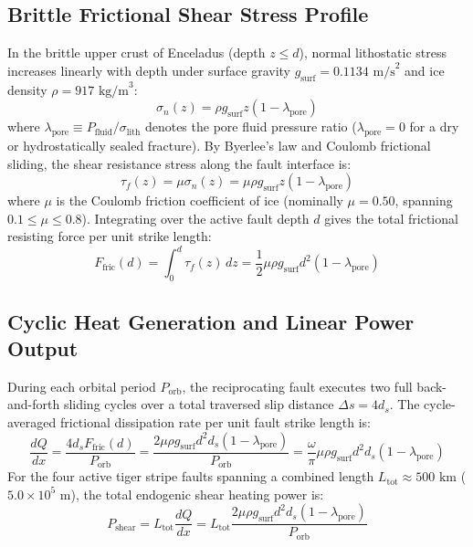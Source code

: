 \documentclass[11pt,a4paper]{article}
\begin{document}
\subsection{Brittle Frictional Shear Stress Profile}
In the brittle upper crust of Enceladus (depth $z \le d$), normal lithostatic stress increases linearly with depth under surface gravity $g_{\text{surf}} = 0.1134\text{ m/s}^2$ and ice density $\rho = 917\text{ kg/m}^3$:
\begin{equation}
\sigma_n(z) = \rho g_{\text{surf}} z (1 - \lambda_{\text{pore}})
\end{equation}
where $\lambda_{\text{pore}} \equiv P_{\text{fluid}} / \sigma_{\text{lith}}$ denotes the pore fluid pressure ratio ($\lambda_{\text{pore}} = 0$ for a dry or hydrostatically sealed fracture). By Byerlee's law and Coulomb frictional sliding, the shear resistance stress along the fault interface is:
\begin{equation}
\tau_f(z) = \mu \sigma_n(z) = \mu \rho g_{\text{surf}} z (1 - \lambda_{\text{pore}})
\end{equation}
where $\mu$ is the Coulomb friction coefficient of ice (nominally $\mu = 0.50$, spanning $0.1 \le \mu \le 0.8$). Integrating over the active fault depth $d$ gives the total frictional resisting force per unit strike length:
\begin{equation}
F_{\text{fric}}(d) = \int_0^d \tau_f(z)\,dz = \frac{1}{2} \mu \rho g_{\text{surf}} d^2 (1 - \lambda_{\text{pore}})
\end{equation}

\subsection{Cyclic Heat Generation and Linear Power Output}
During each orbital period $P_{\text{orb}}$, the reciprocating fault executes two full back-and-forth sliding cycles over a total traversed slip distance $\Delta s = 4 d_s$. The cycle-averaged frictional dissipation rate per unit fault strike length is:
\begin{equation}
\frac{dQ}{dx} = \frac{4 d_s F_{\text{fric}}(d)}{P_{\text{orb}}} = \frac{2 \mu \rho g_{\text{surf}} d^2 d_s (1 - \lambda_{\text{pore}})}{P_{\text{orb}}} = \frac{\omega}{\pi} \mu \rho g_{\text{surf}} d^2 d_s (1 - \lambda_{\text{pore}})
\end{equation}
For the four active tiger stripe faults spanning a combined length $L_{\text{tot}} \approx 500\text{ km}$ ($5.0 \times 10^5\text{ m}$), the total endogenic shear heating power is:
\begin{equation}
P_{\text{shear}} = L_{\text{tot}} \frac{dQ}{dx} = L_{\text{tot}} \frac{2 \mu \rho g_{\text{surf}} d^2 d_s (1 - \lambda_{\text{pore}})}{P_{\text{orb}}}
\end{equation}
\end{document}
